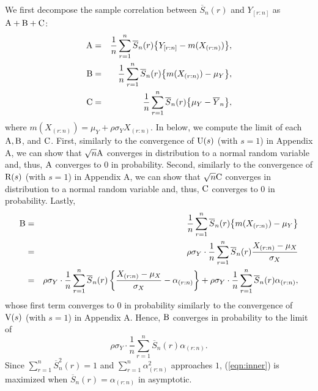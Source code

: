 \documentclass[12pt]{article}
\begin{document}
We first decompose the sample correlation between $\overline{S}_n(r)$ and $Y_{[r:n]}$ as ${\rm A}+{\rm B}+{\rm C}$:
\begin{eqnarray}
{\rm A} &=& \frac{1}{n}  \sum_{r=1}^n \overline{S}_n(r) \big\{ Y_{[r:n]} - m(X_{(r:n)})\big\}, \nonumber\\
{\rm B}&=& \frac{1}{n}   \sum_{r=1}^n \overline{S}_n(r) \big\{m(X_{(r:n)}) - \mu_Y \big\}, \nonumber\\
{\rm C} &=&  \frac{1}{n}  \sum_{r=1}^n \overline{S}_n(r) \big\{ \mu_Y - \overline{Y}_n \big\}, \nonumber
\end{eqnarray}
where $m(X_{(r:n)})=\mu_Y+\rho \sigma_Y X_{(r:n)}$. In below, we compute the limit of each ${\rm A}, {\rm B}$, 
and ${\rm C}$. First, similarly to the convergence of ${\rm U}(s)$ (with $s=1$) in Appendix A, we 
can show that $\sqrt{n} {\rm A}$ converges in distribution to a normal random variable and, thus, 
${\rm A}$ converges to $0$ in probability. Second, similarly to the convergence of ${\rm R}(s)$ (with $s=1$) 
in Appendix A, we can show that $\sqrt{n} {\rm C}$ converges in distribution to a normal random variable and, thus, 
${\rm C}$ converges to $0$ in probability. Lastly, 
\begin{eqnarray}
 {\rm B} &=& \frac{1}{n}   \sum_{r=1}^n \overline{S}_n(r) \big\{m(X_{(r:n)}) - \mu_Y \big\} \nonumber \\
 &=&  \rho \sigma_Y \cdot \frac{1}{n}   \sum_{r=1}^n \overline{S}_n(r) \frac{X_{(r:n)} - \mu_X}{\sigma_X} \nonumber \\
 &=&   \rho \sigma_Y \cdot \frac{1}{n}   \sum_{r=1}^n \overline{S}_n(r) \left\{ \frac{X_{(r:n)} - \mu_X}{\sigma_X}  - \alpha_{(r:n)} \right\} +   \rho \sigma_Y \cdot \frac{1}{n}   \sum_{r=1}^n \overline{S}_n(r) \alpha_{(r:n)}, \nonumber
\end{eqnarray}
 whose first term converges to $0$ in probability similarly to the convergence of ${\rm V}(s)$ (with $s=1$) in Appendix A. 
 Hence, ${\rm B}$ converges in probability to the limit of 
 \begin{equation}\label{eqn:inner}
  \rho \sigma_Y \cdot \frac{1}{n}   \sum_{r=1}^n \overline{S}_n(r) \alpha_{(r:n)}.
 \end{equation} 
 Since $\sum_{r=1}^n \overline{S}^2_n(r)=1$ and $\sum_{r=1}^n \alpha^2_{(r:n)}$ approaches $1$, (\ref{eqn:inner}) 
 is maximized when $\overline{S}_n(r)=\alpha_{(r:n)}$ in asymptotic. 
 
\end{document}
